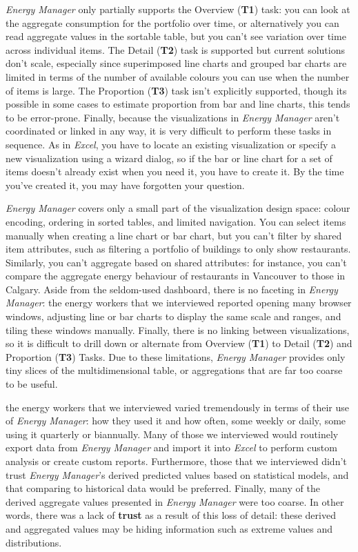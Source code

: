 \documentclass[journal]{vgtc}                %
\newcommand{\bstart}[1]{\vspace{1mm} \noindent{\textbf{#1:}}}
\begin{document}
{\it Energy Manager} only partially supports the Overview ({\bf T1}) task: you can look at the aggregate consumption for the portfolio over time, or alternatively you can read aggregate values in the sortable table, but you can't see variation over time across individual items. 
The Detail ({\bf T2}) task is supported but current solutions don't scale, especially since superimposed line charts and grouped bar charts are limited in terms of the number of available colours you can use when the number of items is large. 
The Proportion ({\bf T3}) task isn't explicitly supported, though its possible in some cases to estimate proportion from bar and line charts, this tends to be error-prone.
Finally, because the visualizations in {\it Energy Manager} aren't coordinated or linked in any way, it is very difficult to perform these tasks in sequence. 
As in {\it Excel}, you have to locate an existing visualization or specify a new visualization using a wizard dialog, so if the bar or line chart for a set of items doesn't already exist when you need it, you have to create it. By the time you've created it, you may have forgotten your question.

{\it Energy Manager} covers only a small part of the visualization design space: colour encoding, ordering in sorted tables, and limited navigation.
You can select items manually when creating a line chart or bar chart, but you can't filter by shared item attributes, such as filtering a portfolio of buildings to only show restaurants.
Similarly, you can't aggregate based on shared attributes: for instance, you can't compare the aggregate energy behaviour of restaurants in Vancouver to those in Calgary.
Aside from the seldom-used dashboard, there is no faceting in {\it Energy Manager}: the energy workers that we interviewed reported opening many browser windows, adjusting line or bar charts to display the same scale and ranges, and tiling these windows manually.
Finally, there is no linking between visualizations, so it is difficult to drill down or alternate from Overview ({\bf T1}) to Detail ({\bf T2}) and Proportion ({\bf T3}) Tasks.
Due to these limitations, {\it Energy Manager} provides only tiny slices of the multidimensional table, or aggregations that are far too coarse to be useful.

\bstart{Interview observations} the energy workers that we interviewed varied tremendously in terms of their use of {\it Energy Manager}: how they used it and how often, some weekly or daily, some using it quarterly or biannually.
Many of those we interviewed would routinely export data from {\it Energy Manager} and import it into {\it Excel} to perform custom analysis or create custom reports.
Furthermore, those that we interviewed didn't trust {\it Energy Manager}'s derived predicted values based on statistical models, and that comparing to historical data would be preferred.
Finally, many of the derived aggregate values presented in {\it Energy Manager} were too coarse. In other words, there was a lack of {\bf trust} as a result of this loss of detail: these derived and aggregated values may be hiding information such as extreme values and distributions.
\end{document}
